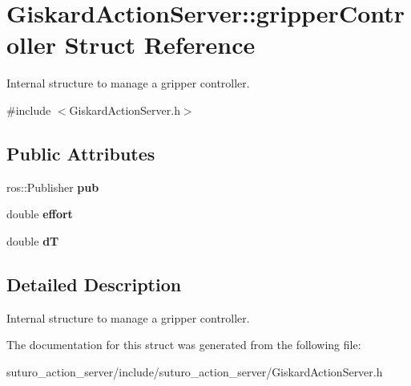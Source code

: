 \hypertarget{structGiskardActionServer_1_1gripperController}{\section{Giskard\-Action\-Server\-:\-:gripper\-Controller Struct Reference}
\label{structGiskardActionServer_1_1gripperController}
}


Internal structure to manage a gripper controller.  




{\ttfamily \#include $<$Giskard\-Action\-Server.\-h$>$}

\subsection*{Public Attributes}
\begin{DoxyCompactItemize}
\item 
\hypertarget{structGiskardActionServer_1_1gripperController_acf5ac1d6c17d6723c12e674e4ad543a4}{ros\-::\-Publisher {\bfseries pub}}\label{structGiskardActionServer_1_1gripperController_acf5ac1d6c17d6723c12e674e4ad543a4}

\item 
\hypertarget{structGiskardActionServer_1_1gripperController_a4363c997632cea9f28fcdecbce64c634}{double {\bfseries effort}}\label{structGiskardActionServer_1_1gripperController_a4363c997632cea9f28fcdecbce64c634}

\item 
\hypertarget{structGiskardActionServer_1_1gripperController_ae871bcd7cc6891a0f66ff08380f5bbe5}{double {\bfseries d\-T}}\label{structGiskardActionServer_1_1gripperController_ae871bcd7cc6891a0f66ff08380f5bbe5}

\end{DoxyCompactItemize}


\subsection{Detailed Description}
Internal structure to manage a gripper controller. 

The documentation for this struct was generated from the following file\-:\begin{DoxyCompactItemize}
\item 
suturo\-\_\-action\-\_\-server/include/suturo\-\_\-action\-\_\-server/Giskard\-Action\-Server.\-h\end{DoxyCompactItemize}
